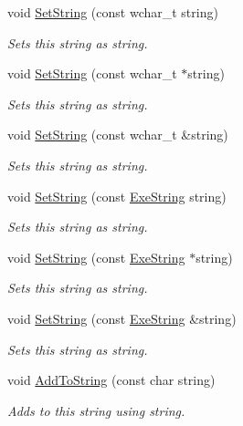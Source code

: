 \begin{DoxyCompactItemize}
void \hyperlink{class_triton_1_1_util_1_1_exe_string_acb20c0d73ff8a325e337ef23e27fecf6}{Set\+String} (const wchar\+\_\+t string)
\begin{DoxyCompactList}\small\item\em Sets this string as string. \end{DoxyCompactList}\item 
void \hyperlink{class_triton_1_1_util_1_1_exe_string_a5439179d3f241cb25e2a29516b516b97}{Set\+String} (const wchar\+\_\+t $\ast$string)
\begin{DoxyCompactList}\small\item\em Sets this string as string. \end{DoxyCompactList}\item 
void \hyperlink{class_triton_1_1_util_1_1_exe_string_afe7a6c9bd92bfef95739c747c3f11fd7}{Set\+String} (const wchar\+\_\+t \&string)
\begin{DoxyCompactList}\small\item\em Sets this string as string. \end{DoxyCompactList}\item 
void \hyperlink{class_triton_1_1_util_1_1_exe_string_a2795ae9972ca8196882f64a1a3a6aa85}{Set\+String} (const \hyperlink{class_triton_1_1_util_1_1_exe_string}{Exe\+String} string)
\begin{DoxyCompactList}\small\item\em Sets this string as string. \end{DoxyCompactList}\item 
void \hyperlink{class_triton_1_1_util_1_1_exe_string_a2dbcc4a4dc47d33b243c75ea32018258}{Set\+String} (const \hyperlink{class_triton_1_1_util_1_1_exe_string}{Exe\+String} $\ast$string)
\begin{DoxyCompactList}\small\item\em Sets this string as string. \end{DoxyCompactList}\item 
void \hyperlink{class_triton_1_1_util_1_1_exe_string_a43f4a1b9a3d8b96bd22a7e5cc887b894}{Set\+String} (const \hyperlink{class_triton_1_1_util_1_1_exe_string}{Exe\+String} \&string)
\begin{DoxyCompactList}\small\item\em Sets this string as string. \end{DoxyCompactList}\item 
void \hyperlink{class_triton_1_1_util_1_1_exe_string_aa35300020a30ea813e98dd7f1e9a9ffc}{Add\+To\+String} (const char string)
\begin{DoxyCompactList}\small\item\em Adds to this string using string. \end{DoxyCompactList}\item 

\end{DoxyCompactItemize}
